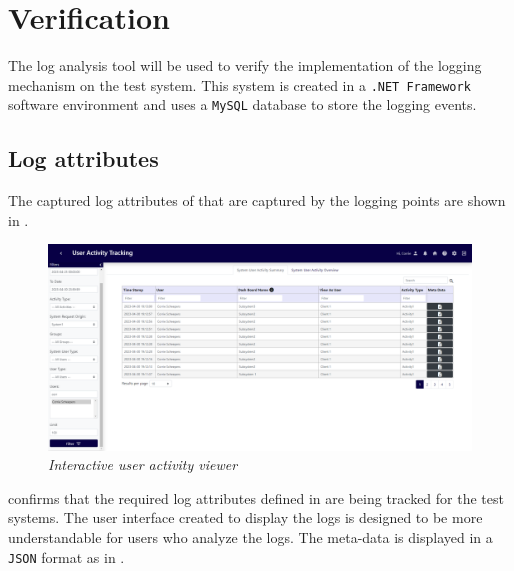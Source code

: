 \section{Verification}
The log analysis tool will be used to verify the implementation of the logging mechanism on the test system. This system is created in a \texttt{.NET Framework} software environment and uses a \texttt{MySQL} database to store the logging events.

\subsection{Log attributes}
The captured log attributes of  that are captured by the logging points are shown in .

\begin{figure}[!htb]
	\centering %
	\includegraphics[width=0.99\linewidth]{img/ch3/analysis/UAT_menu.png}
	\caption[Interactive user activity viewer]
	{\textit{Interactive user activity viewer}}\label{fig:ch3_UAT_menu}
\end{figure}

 confirms that the required log attributes defined in  are being tracked for the test systems. The user interface created to display the logs is designed to be more understandable for users who analyze the logs. The meta-data is displayed in a \texttt{JSON} format as in .

\clearpage

